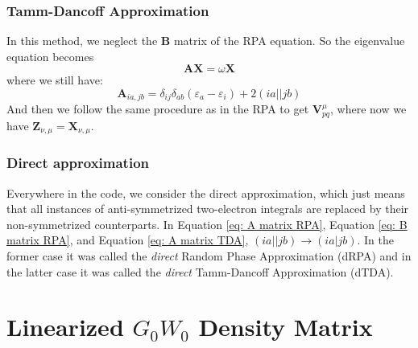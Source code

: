 \documentclass[12pt]{caltech_thesis}
\begin{document}
\subsection{Tamm-Dancoff Approximation}
In this method, we neglect the $\textbf{B}$ matrix of the RPA equation. So the eigenvalue equation becomes
\begin{equation}
    \textbf{A}\textbf{X} = \omega \textbf{X}
\end{equation}
where we still have:
\begin{equation}
    \textbf{A}_{ia,jb} = \delta _{ij}\delta _{ab}(\varepsilon _{a}- \varepsilon _{i}) + 2(ia||jb)
\label{eq: A matrix TDA}
\end{equation}
And then we follow the same procedure as in the RPA to get $\textbf{V}_{pq}^{\mu}$, where now we have $\textbf{Z}_{\nu, \mu} = \textbf{X}_{\nu, \mu}$.
\subsection{Direct approximation}
Everywhere in the code, we consider the direct approximation, which just means that all instances of anti-symmetrized two-electron integrals are replaced by their non-symmetrized counterparts. In Equation \ref{eq: A matrix RPA}, Equation \ref{eq: B matrix RPA}, and Equation \ref{eq: A matrix TDA}, $(ia||jb) \rightarrow (ia|jb)$. In the former case it was called the \emph{direct} Random Phase Approximation (dRPA) and in the latter case it was called the \emph{direct} Tamm-Dancoff Approximation (dTDA).
\chapter{Linearized $G_0W_0$ Density Matrix}
\end{document}
